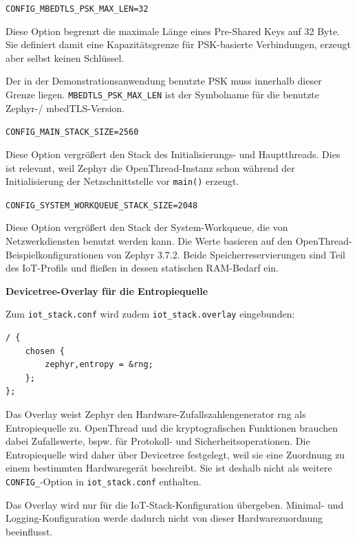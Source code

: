 \lstinline[style=codeinline]|CONFIG_MBEDTLS_PSK_MAX_LEN=32|

Diese Option begrenzt die maximale L{\"a}nge eines Pre-Shared Keys auf 32 Byte. Sie definiert damit eine Kapazit{\"a}tsgrenze f{\"u}r PSK-basierte Verbindungen, erzeugt aber selbst keinen Schl{\"u}ssel.

Der in der Demonstrationsanwendung benutzte PSK muss innerhalb dieser Grenze liegen. \lstinline[style=codeinline]|MBEDTLS_PSK_MAX_LEN| ist der Symbolname f{\"u}r die benutzte Zephyr-/ mbedTLS-Version.

\lstinline[style=codeinline]|CONFIG_MAIN_STACK_SIZE=2560|

Diese Option vergr{\"o}{\ss}ert den Stack des Initialisierungs- und Hauptthreads. Dies ist relevant, weil Zephyr die OpenThread-Instanz schon w{\"a}hrend der Initialisierung der Netzschnittstelle vor \lstinline[style=codeinline]|main()| erzeugt.

\lstinline[style=codeinline]|CONFIG_SYSTEM_WORKQUEUE_STACK_SIZE=2048|

Diese Option vergr{\"o}{\ss}ert den Stack der System-Workqueue, die von Netzwerkdiensten benutzt werden kann. Die Werte basieren auf den OpenThread-Beispielkonfigurationen von Zephyr 3.7.2. Beide Speicherreservierungen sind Teil des IoT-Profils und flie{\ss}en in dessen statischen RAM-Bedarf ein.

\textbf{Devicetree-Overlay f{\"u}r die Entropiequelle}

Zum \lstinline[style=codeinline]|iot_stack.conf| wird zudem \lstinline[style=codeinline]|iot_stack.overlay| eingebunden:

\begin{lstlisting}[style=basecode,language=DTS]
/ {
    chosen {
        zephyr,entropy = &rng;
    };
};
\end{lstlisting}
Das Overlay weist Zephyr den Hardware-Zufallszahlengenerator rng als Entropiequelle zu. OpenThread und die kryptografischen Funktionen brauchen dabei Zufallswerte, bspw. f{\"u}r Protokoll- und Sicherheitsoperationen. Die Entropiequelle wird daher {\"u}ber Devicetree festgelegt, weil sie eine Zuordnung zu einem bestimmten Hardwareger{\"a}t beschreibt. Sie ist deshalb nicht als weitere \lstinline[style=codeinline]|CONFIG_|-Option in \lstinline[style=codeinline]|iot_stack.conf| enthalten.

Das Overlay wird nur f{\"u}r die IoT-Stack-Konfiguration {\"u}bergeben. Minimal- und Logging-Konfiguration werde dadurch nicht von dieser Hardwarezuordnung beeinflusst.

